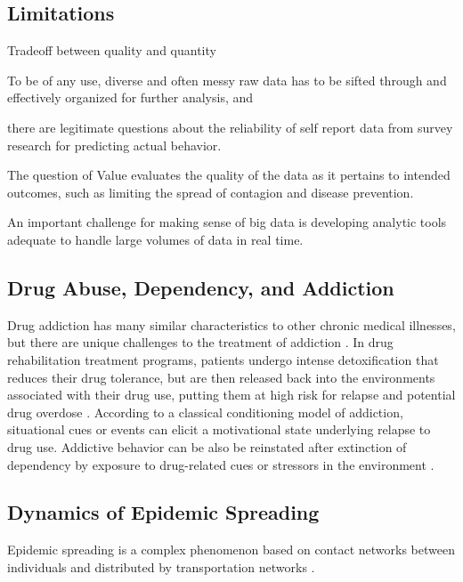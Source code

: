 \documentclass[sigconf]{acmart}
\begin{document}
\subsection{Limitations}

Tradeoff between quality and quantity

To be of any use, diverse and often messy raw data has to be sifted through and 
effectively organized for further analysis, and 

there are legitimate questions about the reliability of self report data from survey
research for predicting actual behavior. 

The question of 
Value evaluates the quality of the data as it pertains to intended outcomes, such 
as limiting the spread of contagion and disease prevention. 

An important challenge for making sense of big data is developing analytic 
tools adequate to handle large volumes of data in real time.

\subsection{Drug Abuse, Dependency, and Addiction}

Drug addiction has many similar characteristics to other chronic medical 
illnesses, but there are unique challenges to the treatment of addiction
\cite{marsch12, swendson16}. In drug rehabilitation treatment programs, 
patients undergo intense detoxification that reduces their drug tolerance, but 
are then released back into the environments associated with their drug use, 
putting them at high risk for relapse and potential drug overdose 
\cite{johnson11}. According to a classical conditioning model of addiction, 
situational cues or events can elicit a motivational state underlying relapse 
to drug use. Addictive behavior can be also be reinstated after extinction of 
dependency by exposure to drug-related cues or stressors in the environment 
\cite{shaham03}. 


\subsection{Dynamics of Epidemic Spreading}

Epidemic spreading is a complex phenomenon based on contact networks between 
individuals and distributed by transportation networks \cite{Colizza06}.
\end{document}
